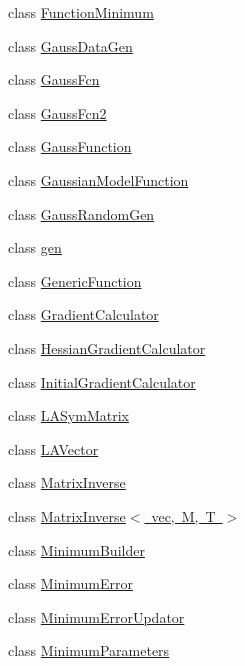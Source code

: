 \begin{DoxyCompactItemize}
\item 
class \mbox{\hyperlink{classROOT_1_1Minuit2_1_1FunctionMinimum}{Function\+Minimum}}
\item 
class \mbox{\hyperlink{classROOT_1_1Minuit2_1_1GaussDataGen}{Gauss\+Data\+Gen}}
\item 
class \mbox{\hyperlink{classROOT_1_1Minuit2_1_1GaussFcn}{Gauss\+Fcn}}
\item 
class \mbox{\hyperlink{classROOT_1_1Minuit2_1_1GaussFcn2}{Gauss\+Fcn2}}
\item 
class \mbox{\hyperlink{classROOT_1_1Minuit2_1_1GaussFunction}{Gauss\+Function}}
\item 
class \mbox{\hyperlink{classROOT_1_1Minuit2_1_1GaussianModelFunction}{Gaussian\+Model\+Function}}
\item 
class \mbox{\hyperlink{classROOT_1_1Minuit2_1_1GaussRandomGen}{Gauss\+Random\+Gen}}
\item 
class \mbox{\hyperlink{classROOT_1_1Minuit2_1_1gen}{gen}}
\item 
class \mbox{\hyperlink{classROOT_1_1Minuit2_1_1GenericFunction}{Generic\+Function}}
\item 
class \mbox{\hyperlink{classROOT_1_1Minuit2_1_1GradientCalculator}{Gradient\+Calculator}}
\item 
class \mbox{\hyperlink{classROOT_1_1Minuit2_1_1HessianGradientCalculator}{Hessian\+Gradient\+Calculator}}
\item 
class \mbox{\hyperlink{classROOT_1_1Minuit2_1_1InitialGradientCalculator}{Initial\+Gradient\+Calculator}}
\item 
class \mbox{\hyperlink{classROOT_1_1Minuit2_1_1LASymMatrix}{L\+A\+Sym\+Matrix}}
\item 
class \mbox{\hyperlink{classROOT_1_1Minuit2_1_1LAVector}{L\+A\+Vector}}
\item 
class \mbox{\hyperlink{classROOT_1_1Minuit2_1_1MatrixInverse}{Matrix\+Inverse}}
\item 
class \mbox{\hyperlink{classROOT_1_1Minuit2_1_1MatrixInverse_3_01vec_00_01M_00_01T_01_4}{Matrix\+Inverse$<$ vec, M, T $>$}}
\item 
class \mbox{\hyperlink{classROOT_1_1Minuit2_1_1MinimumBuilder}{Minimum\+Builder}}
\item 
class \mbox{\hyperlink{classROOT_1_1Minuit2_1_1MinimumError}{Minimum\+Error}}
\item 
class \mbox{\hyperlink{classROOT_1_1Minuit2_1_1MinimumErrorUpdator}{Minimum\+Error\+Updator}}
\item 
class \mbox{\hyperlink{classROOT_1_1Minuit2_1_1MinimumParameters}{Minimum\+Parameters}}

\end{DoxyCompactItemize}
